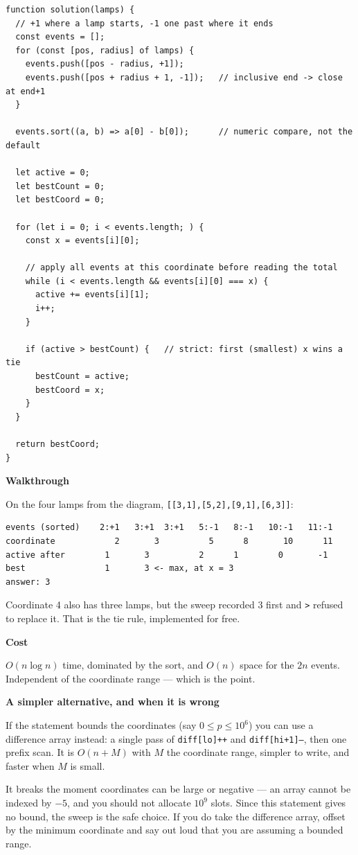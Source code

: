\documentclass[11pt,a4paper]{article}
\newcommand{\blk}[1]{\par\smallskip\noindent\textbf{\color{accent}#1}\par\nopagebreak}
\begin{document}
\begin{lstlisting}
function solution(lamps) {
  // +1 where a lamp starts, -1 one past where it ends
  const events = [];
  for (const [pos, radius] of lamps) {
    events.push([pos - radius, +1]);
    events.push([pos + radius + 1, -1]);   // inclusive end -> close at end+1
  }

  events.sort((a, b) => a[0] - b[0]);      // numeric compare, not the default

  let active = 0;
  let bestCount = 0;
  let bestCoord = 0;

  for (let i = 0; i < events.length; ) {
    const x = events[i][0];

    // apply all events at this coordinate before reading the total
    while (i < events.length && events[i][0] === x) {
      active += events[i][1];
      i++;
    }

    if (active > bestCount) {   // strict: first (smallest) x wins a tie
      bestCount = active;
      bestCoord = x;
    }
  }

  return bestCoord;
}
\end{lstlisting}

\blk{Walkthrough}
On the four lamps from the diagram, \texttt{[[3,1],[5,2],[9,1],[6,3]]}:

\begin{lstlisting}[style=plain]
events (sorted)    2:+1   3:+1  3:+1   5:-1   8:-1   10:-1   11:-1
coordinate            2       3          5      8       10      11
active after        1       3          2      1        0       -1
best                1       3 <- max, at x = 3
answer: 3
\end{lstlisting}

\noindent Coordinate 4 also has three lamps, but the sweep recorded 3 first and
\texttt{>} refused to replace it. That is the tie rule, implemented for free.

\blk{Cost}
$O(n \log n)$ time, dominated by the sort, and $O(n)$ space for the $2n$ events.
Independent of the coordinate range --- which is the point.

\blk{A simpler alternative, and when it is wrong}
If the statement bounds the coordinates (say $0 \le p \le 10^6$) you can use a
difference array instead: a single pass of \texttt{diff[lo]++} and
\texttt{diff[hi+1]--}, then one prefix scan. It is $O(n + M)$ with $M$ the
coordinate range, simpler to write, and faster when $M$ is small.

It breaks the moment coordinates can be large or negative --- an array cannot be
indexed by $-5$, and you should not allocate $10^9$ slots. Since this statement
gives no bound, the sweep is the safe choice. If you do take the difference
array, offset by the minimum coordinate and say out loud that you are assuming a
bounded range.
\end{document}
